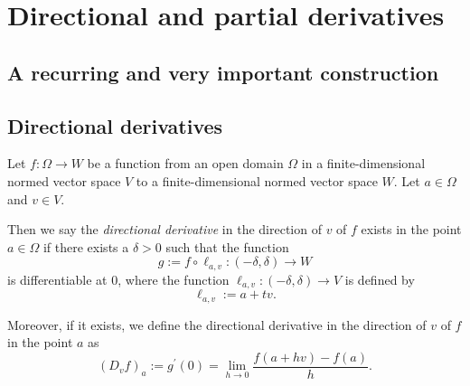 \section{Directional and partial derivatives}

\subsection{A recurring and very important construction}

\subsection{Directional derivatives}
\begin{definition}
    Let $f: \Omega \to W$ be a function from an open domain $\Omega$ 
    in a finite-dimensional normed vector space $V$ to a finite-dimensional
    normed vector space $W$. Let $a \in \Omega$ and $v \in V$.

    Then we say the \emph{directional derivative} in the direction of $v$
    of $f$ exists in the point $a \in \Omega$ if there exists a $\delta > 0$
    such that the function
    $$g:= f \circ \ell_{a,v}:(-\delta,\delta) \to W$$
    is differentiable at $0$, where the function $\ell_{a,v}:(-\delta,\delta) \to V$
    is defined by
    $$\ell_{a,v}:=a+tv.$$

    Moreover, if it exists, we define the directional derivative in the direction
    of $v$ of $f$ in the point $a$ as
    $$(D_vf)_a := g^\prime(0) = \lim_{h\to 0}\frac{f(a+hv)-f(a)}{h}.$$
\end{definition}


